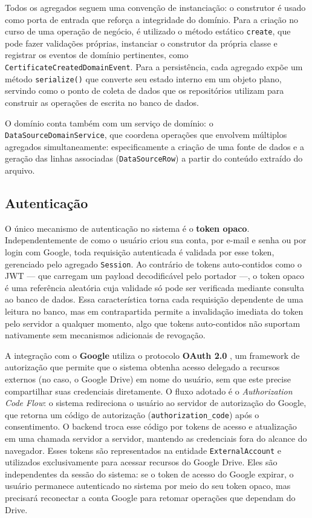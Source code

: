 \documentclass[article,a4paper,12pt,brazil,sumario=tradicional]{abntex2}
\begin{document}
Todos os agregados seguem uma convenção de instanciação: o construtor é usado como porta de entrada que reforça a integridade do domínio. Para a criação no curso de uma operação de negócio, é utilizado o método estático \texttt{create}, que pode fazer validações próprias, instanciar o construtor da própria classe e registrar os eventos de domínio pertinentes, como \texttt{CertificateCreatedDomainEvent}. Para a persistência, cada agregado expõe um método \texttt{serialize()} que converte seu estado interno em um objeto plano, servindo como o ponto de coleta de dados que os repositórios utilizam para construir as operações de escrita no banco de dados.

O domínio conta também com um serviço de domínio: o \texttt{DataSourceDomain\-Service}, que coordena operações que envolvem múltiplos agregados simultaneamente: especificamente a criação de uma fonte de dados e a geração das linhas associadas (\texttt{DataSourceRow}) a partir do conteúdo extraído do arquivo.

\subsection{Autenticação}

O único mecanismo de autenticação no sistema é o \textbf{token opaco}. Independentemente de como o usuário criou sua conta, por e-mail e senha ou por login com Google, toda requisição autenticada é validada por esse token, gerenciado pelo agregado \texttt{Session}. Ao contrário de tokens auto-contidos como o JWT — que carregam um payload decodificável pelo portador —, o token opaco é uma referência aleatória cuja validade só pode ser verificada mediante consulta ao banco de dados. Essa característica torna cada requisição dependente de uma leitura no banco, mas em contrapartida permite a invalidação imediata do token pelo servidor a qualquer momento, algo que tokens auto-contidos não suportam nativamente sem mecanismos adicionais de revogação.

A integração com o \textbf{Google} utiliza o protocolo \textbf{OAuth 2.0}  \cite{rfc6749}, um framework de autorização que permite que o sistema obtenha acesso delegado a recursos externos (no caso, o Google Drive) em nome do usuário, sem que este precise compartilhar suas credenciais diretamente. O fluxo adotado é o \textit{Authorization Code Flow}: o sistema redireciona o usuário ao servidor de autorização do Google, que retorna um código de autorização (\texttt{authorization\_code}) após o consentimento. O backend troca esse código por tokens de acesso e atualização em uma chamada servidor a servidor, mantendo as credenciais fora do alcance do navegador. Esses tokens são representados na entidade \texttt{ExternalAccount} e utilizados exclusivamente para acessar recursos do Google Drive. Eles são independentes da sessão do sistema: se o token de acesso do Google expirar, o usuário permanece autenticado no sistema por meio do seu token opaco, mas precisará reconectar a conta Google para retomar operações que dependam do Drive.
\end{document}
